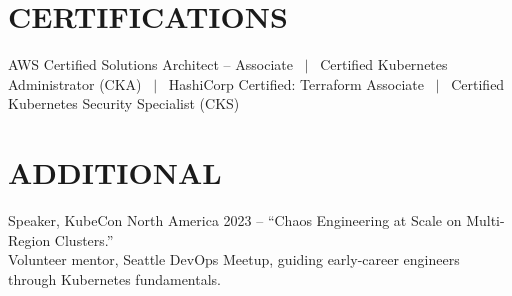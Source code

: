 \documentclass[10pt,letterpaper]{article}
\begin{document}
\section{CERTIFICATIONS}
AWS Certified Solutions Architect -- Associate \ $|$ \ Certified Kubernetes Administrator (CKA) \ $|$ \ HashiCorp Certified: Terraform Associate \ $|$ \ Certified Kubernetes Security Specialist (CKS)

\section{ADDITIONAL}
Speaker, KubeCon North America 2023 -- ``Chaos Engineering at Scale on Multi-Region Clusters.'' \\
Volunteer mentor, Seattle DevOps Meetup, guiding early-career engineers through Kubernetes fundamentals.
\end{document}
